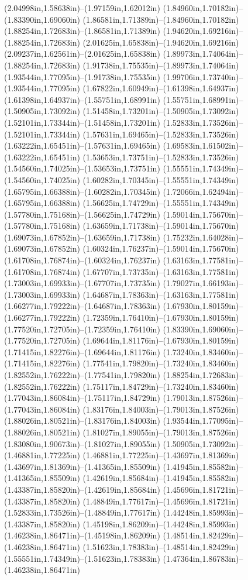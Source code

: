 (2.04998in,1.58638in)--(1.97159in,1.62012in) (1.84960in,1.70182in)--(1.83390in,1.69060in) (1.86581in,1.71389in)--(1.84960in,1.70182in) (1.88254in,1.72683in)--(1.86581in,1.71389in) (1.94620in,1.69216in)--(1.88254in,1.72683in) (2.01625in,1.65838in)--(1.94620in,1.69216in) (2.09237in,1.62561in)--(2.01625in,1.65838in) (1.89973in,1.74064in)--(1.88254in,1.72683in) (1.91738in,1.75535in)--(1.89973in,1.74064in) (1.93544in,1.77095in)--(1.91738in,1.75535in) (1.99706in,1.73740in)--(1.93544in,1.77095in) (1.67822in,1.60949in)--(1.61398in,1.64937in) (1.61398in,1.64937in)--(1.55751in,1.68991in) (1.55751in,1.68991in)--(1.50905in,1.73092in) (1.51458in,1.73201in)--(1.50905in,1.73092in) (1.52101in,1.73344in)--(1.51458in,1.73201in) (1.52833in,1.73526in)--(1.52101in,1.73344in) (1.57631in,1.69465in)--(1.52833in,1.73526in) (1.63222in,1.65451in)--(1.57631in,1.69465in) (1.69583in,1.61502in)--(1.63222in,1.65451in) (1.53653in,1.73751in)--(1.52833in,1.73526in) (1.54560in,1.74025in)--(1.53653in,1.73751in) (1.55551in,1.74349in)--(1.54560in,1.74025in) (1.60282in,1.70345in)--(1.55551in,1.74349in) (1.65795in,1.66388in)--(1.60282in,1.70345in) (1.72066in,1.62494in)--(1.65795in,1.66388in) (1.56625in,1.74729in)--(1.55551in,1.74349in) (1.57780in,1.75168in)--(1.56625in,1.74729in) (1.59014in,1.75670in)--(1.57780in,1.75168in) (1.63659in,1.71738in)--(1.59014in,1.75670in) (1.69073in,1.67852in)--(1.63659in,1.71738in) (1.75232in,1.64028in)--(1.69073in,1.67852in) (1.60324in,1.76237in)--(1.59014in,1.75670in) (1.61708in,1.76874in)--(1.60324in,1.76237in) (1.63163in,1.77581in)--(1.61708in,1.76874in) (1.67707in,1.73735in)--(1.63163in,1.77581in) (1.73003in,1.69933in)--(1.67707in,1.73735in) (1.79027in,1.66193in)--(1.73003in,1.69933in) (1.64687in,1.78363in)--(1.63163in,1.77581in) (1.66277in,1.79222in)--(1.64687in,1.78363in) (1.67930in,1.80159in)--(1.66277in,1.79222in) (1.72359in,1.76410in)--(1.67930in,1.80159in) (1.77520in,1.72705in)--(1.72359in,1.76410in) (1.83390in,1.69060in)--(1.77520in,1.72705in) (1.69644in,1.81176in)--(1.67930in,1.80159in) (1.71415in,1.82276in)--(1.69644in,1.81176in) (1.73240in,1.83460in)--(1.71415in,1.82276in) (1.77541in,1.79820in)--(1.73240in,1.83460in) (1.82552in,1.76222in)--(1.77541in,1.79820in) (1.88254in,1.72683in)--(1.82552in,1.76222in) (1.75117in,1.84729in)--(1.73240in,1.83460in) (1.77043in,1.86084in)--(1.75117in,1.84729in) (1.79013in,1.87526in)--(1.77043in,1.86084in) (1.83176in,1.84003in)--(1.79013in,1.87526in) (1.88026in,1.80521in)--(1.83176in,1.84003in) (1.93544in,1.77095in)--(1.88026in,1.80521in) (1.81027in,1.89055in)--(1.79013in,1.87526in) (1.83080in,1.90673in)--(1.81027in,1.89055in) (1.50905in,1.73092in)--(1.46881in,1.77225in) (1.46881in,1.77225in)--(1.43697in,1.81369in) (1.43697in,1.81369in)--(1.41365in,1.85509in) (1.41945in,1.85582in)--(1.41365in,1.85509in) (1.42619in,1.85684in)--(1.41945in,1.85582in) (1.43387in,1.85820in)--(1.42619in,1.85684in) (1.45696in,1.81721in)--(1.43387in,1.85820in) (1.48849in,1.77617in)--(1.45696in,1.81721in) (1.52833in,1.73526in)--(1.48849in,1.77617in) (1.44248in,1.85993in)--(1.43387in,1.85820in) (1.45198in,1.86209in)--(1.44248in,1.85993in) (1.46238in,1.86471in)--(1.45198in,1.86209in) (1.48514in,1.82429in)--(1.46238in,1.86471in) (1.51623in,1.78383in)--(1.48514in,1.82429in) (1.55551in,1.74349in)--(1.51623in,1.78383in) (1.47364in,1.86783in)--(1.46238in,1.86471in) 